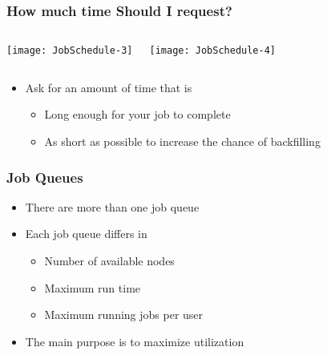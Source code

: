 \documentclass[slidestop,mathserif,compress,xcolor=svgnames,table]{beamer}
\newenvironment{bblock}[0]
{
\begin{beamerboxesrounded}[upper=uppercol1,lower=lowercol1,shadow=true]}
{\end{beamerboxesrounded}}
\begin{document}
\begin{frame}
  \frametitle{\small How much time Should I request?}
  \begin{columns}
    \vspace{-1cm}
    \begin{center}
      \texttt{[image: JobSchedule-3]}
    \end{center}
    \vspace{-1cm}
    \begin{center}
      \texttt{[image: JobSchedule-4]}
    \end{center}
  \end{columns}
  \begin{bblock}{}
    \begin{itemize}
      \item Ask for an amount of time that is
      \begin{itemize}
	\item Long enough for your job to complete
	\item As short as possible to increase the chance of backfilling
      \end{itemize}
    \end{itemize}
  \end{bblock}
\end{frame}

\begin{frame}
  \frametitle{\small Job Queues}
  \begin{bblock}{}
    \begin{itemize}
      \item There are more than one job queue
      \item Each job queue differs in
      \begin{itemize}
	\item Number of available nodes
	\item Maximum run time
	\item Maximum running jobs per user
      \end{itemize}
      \item The main purpose is to maximize utilization
    \end{itemize}
  \end{bblock}
\end{frame}
\end{document}
